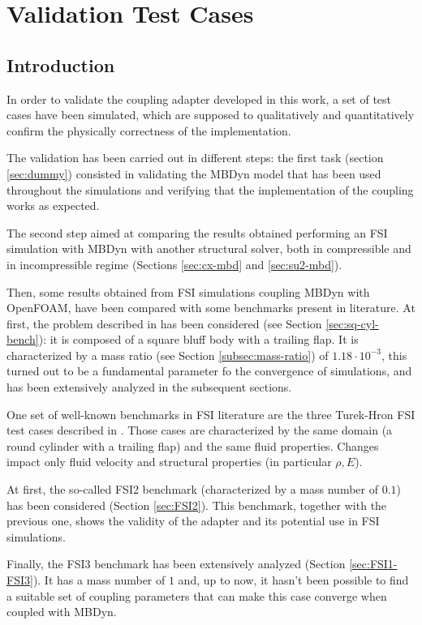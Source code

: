 \chapter{Validation Test Cases}
\label{cha:tests}


\section{Introduction}

In order to validate the coupling adapter developed in this work, a set of test cases have been simulated, which are supposed to qualitatively and quantitatively confirm the physically correctness of the implementation.

The validation has been carried out in different steps: the first task (section \ref{sec:dummy}) consisted in validating the MBDyn model that has been used throughout the simulations and verifying that the implementation of the coupling works as expected.

The second step aimed at comparing the results obtained performing an FSI simulation with MBDyn with another structural solver, both in compressible and in incompressible regime (Sections \ref{sec:cx-mbd} and \ref{sec:su2-mbd}).

Then, some results obtained from FSI simulations coupling MBDyn with OpenFOAM, have been compared with some benchmarks present in literature. At first, the problem described in \cite{ramm1998fluid} has been considered (see Section \ref{sec:sq-cyl-bench}): it is composed of a square bluff body with a trailing flap. It is characterized by a mass ratio (see Section \ref{subsec:mass-ratio}) of $1.18\cdot 10^{-3}$, this turned out to be a fundamental parameter fo the convergence of simulations, and has been extensively analyzed in the subsequent sections.

One set of well-known benchmarks in FSI literature are the three Turek-Hron FSI test cases described in \cite{turek2006proposal}. Those cases are characterized by the same domain (a round cylinder with a trailing flap) and the same fluid properties. Changes impact only fluid velocity and structural properties (in particular $\rho,E$).

At first, the so-called FSI2 benchmark (characterized by a mass number of $0.1$) has been considered (Section \ref{sec:FSI2}). This benchmark, together with the previous one, shows the validity of the adapter and its potential use in FSI simulations.

Finally, the FSI3 benchmark has been extensively analyzed (Section \ref{sec:FSI1-FSI3}). It has a mass number of $1$ and, up to now, it hasn't been possible to find a suitable set of coupling parameters that can make this case converge when coupled with MBDyn.

